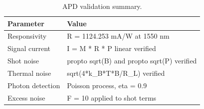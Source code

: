 \begin{table}[!ht]
  \caption{APD validation summary.}
  \label{tab:apd}
  \centering
  \begin{tabular}{l l}
    \toprule
    Parameter & Value \\
    \midrule
    Responsivity & R = 1124.253 mA/W at 1550 nm \\
    Signal current & I = M * R * P linear verified \\
    Shot noise & propto sqrt(B) and propto sqrt(P) verified \\
    Thermal noise & sqrt(4*k\_B*T*B/R\_L) verified \\
    Photon detection & Poisson process, eta = 0.9 \\
    Excess noise & F = 10 applied to shot terms \\
    \bottomrule
  \end{tabular}
\end{table}
